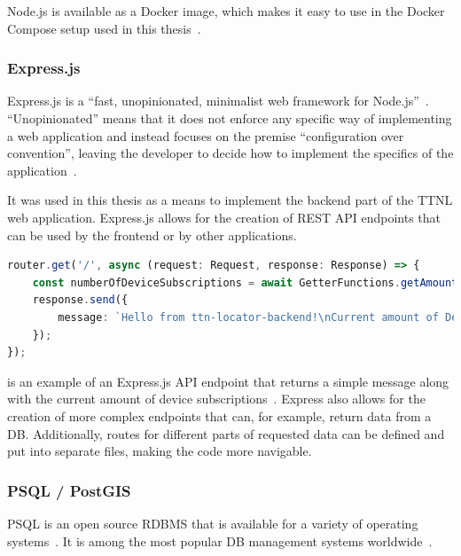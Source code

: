Node.js is available as a Docker image, which makes it easy to use in the Docker Compose setup used in this thesis~\cite{docker_inc_node_2023}.

\subsubsection{Express.js}

Express.js is a ``fast, unopinionated, minimalist web framework for Node.js''~\cite{openjs_foundation_express_nodate}.
``Unopinionated'' means that it does not enforce any specific way of implementing a web application and instead focuses on the premise ``configuration over convention'', leaving the developer to decide how to implement the specifics of the application~\cite{mardan_pro_2014}.

It was used in this thesis as a means to implement the backend part of the \ac{TTNL} web application.
Express.js allows for the creation of \ac{REST} \ac{API} endpoints that can be used by the frontend or by other applications.

\begin{lstlisting}[language=TypeScript, float, caption={Example of an Express.js \ac{API} endpoint}, label={lst:express-api-endpoint}]
router.get('/', async (request: Request, response: Response) => {
    const numberOfDeviceSubscriptions = await GetterFunctions.getAmountOfDeviceSubscriptions();
    response.send({
        message: `Hello from ttn-locator-backend!\nCurrent amount of Device subscriptions: ${numberOfDeviceSubscriptions}`,
    });
});
\end{lstlisting}

 is an example of an Express.js \ac{API} endpoint that returns a simple message along with the current amount of device subscriptions~\cite{openjs_foundation_express_routing}.
Express also allows for the creation of more complex endpoints that can, for example, return data from a \ac{DB}.
Additionally, routes for different parts of requested data can be defined and put into separate files, making the code more navigable.

\subsubsection{\ac{PSQL} / PostGIS}

\ac{PSQL} is an open source \ac{RDBMS} that is available for a variety of operating systems~\cite{postgresql_global_development_group_postgresql_2023}.
It is among the most popular \ac{DB} management systems worldwide~\cite{db-engines_most_2023}.


